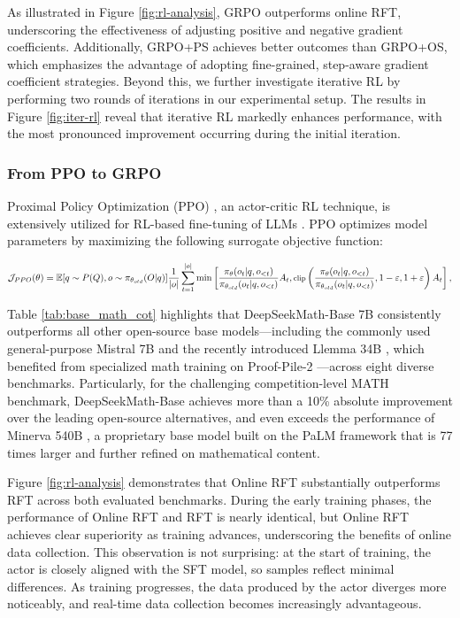 \begin{itemize}[topsep=0pt]
As illustrated in Figure \ref{fig:rl-analysis}, GRPO outperforms online RFT, underscoring the effectiveness of adjusting positive and negative gradient coefficients. Additionally, GRPO+PS achieves better outcomes than GRPO+OS, which emphasizes the advantage of adopting fine-grained, step-aware gradient coefficient strategies. Beyond this, we further investigate iterative RL by performing two rounds of iterations in our experimental setup. The results in Figure \ref{fig:iter-rl} reveal that iterative RL markedly enhances performance, with the most pronounced improvement occurring during the initial iteration.

\subsubsection{From PPO to GRPO}
Proximal Policy Optimization (PPO) \citep{schulman2017proximal}, an actor-critic RL technique, is extensively utilized for RL-based fine-tuning of LLMs \citep{ouyang2022training}. PPO optimizes model parameters by maximizing the following surrogate objective function:

\begin{equation}
\footnotesize
        \mathcal{J}_{PPO}(\theta) = \mathbb{E}{[q \sim P(Q), o \sim \pi_{\theta_{old}}(O|q)]} \frac{1}{|o|} \sum_{t=1}^{|o|} \min \left[ \frac{\pi_\theta(o_{t} | q, o_{<t})}{\pi_{\theta_{old}}(o_{t} | q, o_{<t})} A_{t}, \text{clip} \left( \frac{\pi_\theta(o_{t} | q, o_{<t})}{\pi_{\theta_{old}}(o_{t} | q, o_{<t})}, 1 - \varepsilon, 1 + \varepsilon \right)  A_{t} \right] ,
\end{equation}

Table \ref{tab:base_math_cot} highlights that DeepSeekMath-Base 7B consistently outperforms all other open-source base models—including the commonly used general-purpose Mistral 7B \citep{mistral} and the recently introduced Llemma 34B \citep{llemma}, which benefited from specialized math training on Proof-Pile-2 \citep{llemma}—across eight diverse benchmarks. Particularly, for the challenging competition-level MATH benchmark, DeepSeekMath-Base achieves more than a 10\% absolute improvement over the leading open-source alternatives, and even exceeds the performance of Minerva 540B \citep{minerva}, a proprietary base model built on the PaLM framework \citep{palm} that is 77 times larger and further refined on mathematical content.

Figure \ref{fig:rl-analysis} demonstrates that Online RFT substantially outperforms RFT across both evaluated benchmarks. During the early training phases, the performance of Online RFT and RFT is nearly identical, but Online RFT achieves clear superiority as training advances, underscoring the benefits of online data collection. This observation is not surprising: at the start of training, the actor is closely aligned with the SFT model, so samples reflect minimal differences. As training progresses, the data produced by the actor diverges more noticeably, and real-time data collection becomes increasingly advantageous.


\end{itemize}
